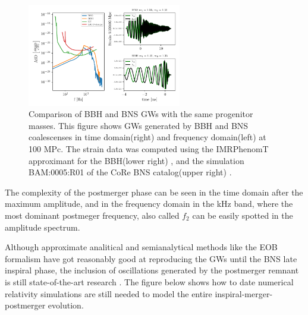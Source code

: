 \begin{figure}[hbt!]
\begin{center}
\includegraphics[width=0.6\textwidth, angle=0]{images/Data_analysis/sig_proc/BNS-BBH.pdf}
\captionsetup{width=0.8\textwidth}
\caption[Comparison of BBH and BNS GWs with the same progenitor masses]{Comparison of BBH and BNS GWs with the same progenitor masses. This figure shows GWs generated by BBH and BNS coalescenses in time domain(right) and frequency domain(left) at 100 MPc. The strain data was computed using the IMRPhenomT approximant for the BBH(lower right) \cite{Estelles:2020osj}, and the simulation BAM:0005:R01 of the CoRe BNS catalog(upper right) \cite{Dietrich:2018phi}.}
\label{BBH and BNS}
\end{center}
\end{figure}

\FloatBarrier

The complexity of the postmerger phase can be seen in the time domain after the maximum amplitude, and in the frequency domain in the kHz band, where the most dominant postmeger frequency, also called $f_2$ can be easily spotted in the amplitude spectrum. 

Although approximate analitical and semianalytical methods like the EOB formalism \cite{Damour:2012yf,PhysRevD.96.121501,Dietrich:2018uni} have got reasonably good at reproducing the GWs until the BNS late inspiral phase, the inclusion of oscillations generated by the postmerger remnant is still state-of-the-art research \cite{Breschi:2019srl, Tsang:2019esi, Soultanis:2021oia, https://doi.org/10.48550/arxiv.2205.09112}. The figure below shows how to date numerical relativity simulations are still needed to model the entire inspiral-merger-postmerger evolution.


